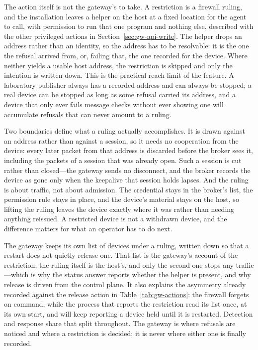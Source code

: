 \documentclass[12pt,a4paper]{report}
\begin{document}
The action itself is not the gateway's to take. A restriction is a
firewall ruling, and the installation leaves a helper on the host at a
fixed location for the agent to call, with permission to run that one
program and nothing else, described with the other privileged actions
in Section~\ref{sec:gw-api-write}. The helper drops an address rather
than an identity, so the address has to be resolvable: it is the one the
refusal arrived from, or, failing that, the one recorded for the device.
Where neither yields a usable host address, the restriction is skipped
and only the intention is written down. This is the practical
reach-limit of the feature. A laboratory publisher always has a recorded
address and can always be stopped; a real device can be stopped as long
as some refusal carried its address, and a device that only ever fails
message checks without ever showing one will accumulate refusals that
can never amount to a ruling.

Two boundaries define what a ruling actually accomplishes. It is drawn
against an address rather than against a session, so it needs no
cooperation from the device: every later packet from that address is
discarded before the broker sees it, including the packets of a session
that was already open. Such a session is cut rather than closed---the
gateway sends no disconnect, and the broker records the device as gone
only when the keepalive that session holds lapses. And the ruling is
about traffic, not about admission. The credential stays in the
broker's list, the permission rule stays in place, and the device's
material stays on the host, so lifting the ruling leaves the device
exactly where it was rather than needing anything reissued. A
restricted device is not a withdrawn device, and the difference matters
for what an operator has to do next.

The gateway keeps its own list of devices under a ruling, written down
so that a restart does not quietly release one. That list is the
gateway's account of the restriction; the ruling itself is the host's,
and only the second one stops any traffic---which is why the status
answer reports whether the helper is present, and why release is driven
from the control plane. It also explains the asymmetry already recorded
against the release action in Table~\ref{tab:gw-actions}: the firewall
forgets on command, while the process that reports the restriction read
its list once, at its own start, and will keep reporting a device held
until it is restarted. Detection and response share that split
throughout. The gateway is where refusals are noticed and where a
restriction is decided; it is never where either one is finally
recorded.
\end{document}
